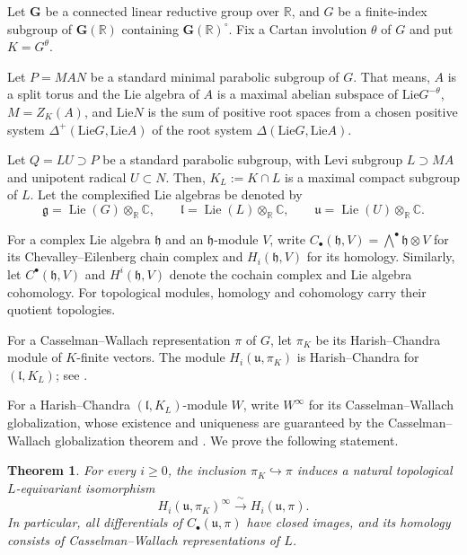 \documentclass[a4paper,12pt]{amsart}
\numberwithin{equation}{section}
\theoremstyle{plain}
\newtheorem{theorem}{Theorem}[section]
\theoremstyle{definition}
\theoremstyle{remark}
\newcommand{\Lie}{\mathrm{Lie}}
\begin{document}
Let $\mathbf G$ be a connected linear reductive group over $\mathbb R$, and $G$ be a finite-index subgroup of $\mathbf G(\mathbb R)$ containing $\mathbf G(\mathbb R)^\circ$.
Fix a Cartan involution $\theta$ of $G$ and put $K=G^{\theta}$.

Let $P=MAN$ be a standard minimal parabolic subgroup of $G$.
That means, $A$ is a split torus and the Lie algebra of $A$ is a maximal abelian subspace of $\Lie G^{-\theta}$, $M=Z_{K}(A)$, and $\Lie N$ is the sum of positive root spaces from a chosen positive system $\Delta^{+}(\Lie G,\Lie A)$ of the root system $\Delta(\Lie G,\Lie A)$.

Let $Q=LU\supset P$ be a standard parabolic subgroup, with Levi subgroup $L\supset MA$ and unipotent radical $U\subset N$.
Then, $K_{L}:=K\cap L$ is a maximal compact subgroup of $L$.
Let the complexified Lie algebras be denoted by 
\[
 \mathfrak g=\operatorname{Lie}(G)\otimes_{\mathbb R}\mathbb C,
 \qquad \mathfrak l=\operatorname{Lie}(L)\otimes_{\mathbb R}\mathbb C,
 \qquad \mathfrak u=\operatorname{Lie}(U)\otimes_{\mathbb R}\mathbb C.
\]

For a complex Lie algebra $\mathfrak h$ and an $\mathfrak h$-module $V$, write $C_\bullet(\mathfrak h,V)=\bigwedge^\bullet\mathfrak h\otimes V$ for its Chevalley--Eilenberg chain complex and $H_i(\mathfrak h,V)$ for its homology.
Similarly, let  $C^\bullet(\mathfrak h,V)$ and $H^i(\mathfrak h,V)$ denote the cochain complex and Lie algebra cohomology.
For topological modules, homology and cohomology carry their quotient topologies.

For a Casselman--Wallach representation $\pi$ of $G$, let $\pi_K$ be its Harish--Chandra module of $K$-finite vectors.
The module $H_i(\mathfrak u,\pi_K)$ is Harish--Chandra for $(\mathfrak l,K_L)$; see \cite[Proposition~2.24]{HS83}.

For a Harish--Chandra $(\mathfrak l,K_L)$-module $W$, write $W^\infty$ for its Casselman--Wallach globalization, whose existence and uniqueness are guaranteed by the Casselman--Wallach globalization theorem \cite{Casselman89} and \cite[Chapter~11]{Wallach2}.
We prove the following statement.

\begin{theorem}\label{comparison conj}
For every $i\geq0$, the inclusion $\pi_K\hookrightarrow\pi$ induces a natural topological $L$-equivariant isomorphism
\[
 H_i(\mathfrak u,\pi_K)^\infty\xrightarrow{\ \sim\ }
 H_i(\mathfrak u,\pi).
\]
In particular, all differentials of $C_\bullet(\mathfrak u,\pi)$ have closed images, and its homology consists of Casselman--Wallach representations of $L$.
\end{theorem}
\end{document}

